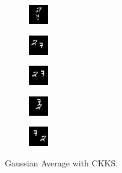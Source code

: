 \begin{subfigure}[t]{0.9\textwidth}
    \centering
    \begin{subfigure}[t]{0.19\textwidth}
        \centering
        \includegraphics[scale=2]{figures/CKKS-GAUSSIAN/frame0}
    \end{subfigure}
    \hfill
    \begin{subfigure}[t]{0.19\textwidth}
        \centering
        \includegraphics[scale=2]{figures/CKKS-GAUSSIAN/frame4}
    \end{subfigure}
    \hfill
    \begin{subfigure}[t]{0.19\textwidth}
        \centering
        \includegraphics[scale=2]{figures/CKKS-GAUSSIAN/frame8}
    \end{subfigure}
    \hfill
    \begin{subfigure}[t]{0.19\textwidth}
        \centering
        \includegraphics[scale=2]{figures/CKKS-GAUSSIAN/frame12}
    \end{subfigure}
    \hfill
    \begin{subfigure}[t]{0.19\textwidth}
        \centering
        \includegraphics[scale=2]{figures/CKKS-GAUSSIAN/frame16}
    \end{subfigure}
    \caption{Gaussian Average with CKKS.}
\end{subfigure}
\\ \bigskip
